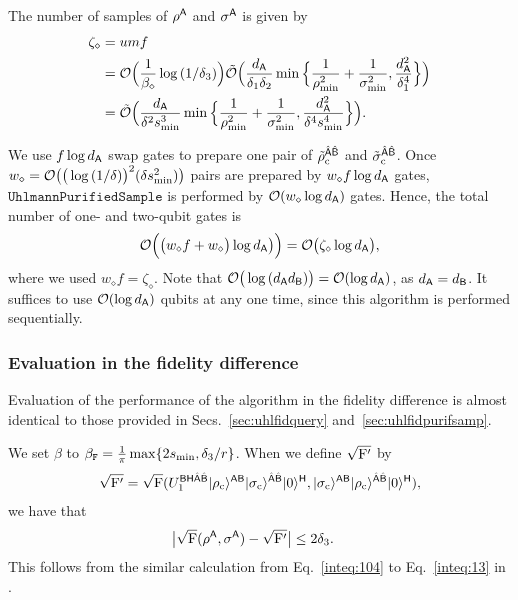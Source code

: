 The number of samples of $\rho^{\mathsf{A}}$ and $\sigma^{\mathsf{A}}$ is given by
\begin{align}
\label{inteq:45}
    \zeta_\diamond 
    &= umf \\
    &= {\mathcal{O}}\Big(\frac{1}{\beta_\diamond}\log{(1/\delta_3)}\Big)\tilde{{\mathcal{O}}}\Big(\frac{d_{\mathsf{A}}}{\delta_1\delta_2}\min\Big\{\frac{1}{\rho_{\rm min}^2} + \frac{1}{\sigma_{\rm min}^2}, \frac{d_{\mathsf{A}}^2}{\delta_1^4}\Big\}\Big)    \\
    \label{inteq:44}
    &= \tilde{{\mathcal{O}}}\Big(\frac{d_{\mathsf{A}}}{\delta^2 s_{\rm min}^3} \min\Big\{\frac{1}{\rho_{\rm min}^2} + \frac{1}{\sigma_{\rm min}^2}, \frac{d_{\mathsf{A}}^2}{\delta^4 s_{\rm min}^4}\Big\}\Big).
\end{align}

We use $f\log{d_{\mathsf{A}}}$ swap gates to prepare one pair of $\tilde{\rho}_{\rm c}^{\hat{{\mathsf{A}}}\hat{{\mathsf{B}}}}$ and $\tilde{\sigma}_{\rm c}^{\hat{{\mathsf{A}}}\hat{{\mathsf{B}}}}$. 
Once $w_\diamond = {\mathcal{O}}\big(\big(\log{(1/\delta)}\big)^2(\delta s_{\rm min}^2)\big)$ pairs are prepared by $w_\diamond f \log{d_{\mathsf{A}}}$ gates, $\mathtt{UhlmannPurifiedSample}$ is performed by ${\mathcal{O}}(w_\diamond\log{d_{\mathsf{A}}})$ gates. 
Hence, the total number of one- and two-qubit gates is 
\begin{equation}
    {\mathcal{O}}\Big(\big(w_\diamond f + w_\diamond\big)\log{d_{\mathsf{A}}}\big)\Big) = {\mathcal{O}}\big(\zeta_\diamond\log{d_{\mathsf{A}}}\big),
\end{equation}
where we used $w_\diamond f = \zeta_\diamond$.
Note that ${\mathcal{O}}\big(\log{(d_{\mathsf{A}}d_{\mathsf{B}})}\big) = {\mathcal{O}}(\log{d_{\mathsf{A}}})$, as $d_{\mathsf{A}} = d_{\mathsf{B}}$.
It suffices to use ${\mathcal{O}}(\log{d_{\mathsf{A}}})$ qubits at any one time, since this algorithm is performed sequentially.







\subsubsection{Evaluation in the fidelity difference}
\label{sec:uhlfidsamp}



Evaluation of the performance of the algorithm in the fidelity difference is almost identical to those provided in Secs.~\ref{sec:uhlfidquery} and~\ref{sec:uhlfidpurifsamp}.

We set $\beta$ to $\beta_{\mathtt{F}} = \frac{1}{\pi}\max\{2s_{\rm min}, \delta_3/r\}$. When we define $\sqrt{{\mathrm{F}}'}$ by 
\begin{align}
    \sqrt{{\mathrm{F}}'} = \sqrt{{\mathrm{F}}}(U_1^{{\mathsf{B}}{\mathsf{H}}\hat{{\mathsf{A}}}\hat{{\mathsf{B}}}}|\rho_{\rm c}\rangle^{{\mathsf{A}}{\mathsf{B}}}|\sigma_{\rm c}\rangle^{\hat{{\mathsf{A}}}\hat{{\mathsf{B}}}}|0\rangle^{{\mathsf{H}}}, |\sigma_{\rm c}\rangle^{{\mathsf{A}}{\mathsf{B}}}|\rho_{\rm c}\rangle^{\hat{{\mathsf{A}}}\hat{{\mathsf{B}}}}|0\rangle^{{\mathsf{H}}}),
\end{align}
we have that
\begin{align}
\label{inteq:77}
    &\big|\sqrt{{\mathrm{F}}}(\rho^{\mathsf{A}}, \sigma^{\mathsf{A}}) - \sqrt{{\mathrm{F}}'}\big| \leq 2\delta_3.
\end{align}
This follows from the similar calculation from Eq.~\eqref{inteq:104} to Eq.~\eqref{inteq:13} in .


